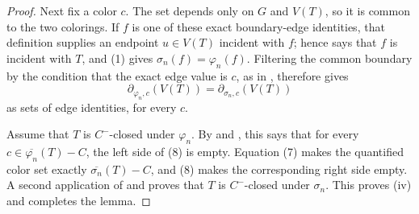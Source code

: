 \begin{proof}
Next fix a color $c$.  The set  depends only on
$G$ and $V(T)$, so it is common to the two colorings.  If $f$ is one of
these exact boundary-edge identities, that definition supplies an
endpoint $u\in V(T)$ incident with $f$; hence
 says that $f$ is incident with $T$, and (1)
gives $\sigma_n(f)=\varphi_n(f)$.  Filtering the common boundary by the
condition that the exact edge value is $c$, as in
, therefore gives
\[
 \partial_{\varphi_n,c}(V(T))
   =\partial_{\sigma_n,c}(V(T))                              \tag{8}
\]
as sets of edge identities, for every $c$.

Assume that $T$ is $C^{-}$-closed under $\varphi_n$.
By  and
, this says that for every
$c\in\overline{\varphi_n}(T)-C$, the left side of (8) is empty.
Equation (7) makes the quantified color set exactly
$\overline{\sigma_n}(T)-C$, and (8) makes the corresponding right side
empty.  A second application of  and
 proves that $T$ is $C^{-}$-closed
under $\sigma_n$.  This proves (iv) and completes the lemma.
\end{proof}
